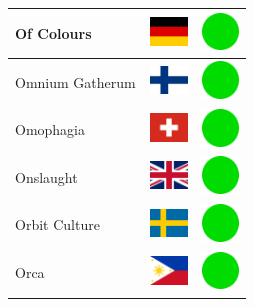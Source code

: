 \documentclass[12pt, a4paper, twoside]{report}
\begin{document}
\begin{center}
\begin{longtable}{|p{5cm}|p{2cm}|p{2cm}|}
			Of Colours & \includegraphics[width=1cm]{4x3/de} & \includegraphics[width=1cm]{likes/y} \\ \hline
			Omnium Gatherum & \includegraphics[width=1cm]{4x3/fi} & \includegraphics[width=1cm]{likes/y} \\ \hline
			Omophagia & \includegraphics[width=1cm]{4x3/ch} & \includegraphics[width=1cm]{likes/y} \\ \hline
			Onslaught & \includegraphics[width=1cm]{4x3/gb} & \includegraphics[width=1cm]{likes/y} \\ \hline
			Orbit Culture & \includegraphics[width=1cm]{4x3/se} & \includegraphics[width=1cm]{likes/y} \\ \hline
			Orca & \includegraphics[width=1cm]{4x3/ph} & \includegraphics[width=1cm]{likes/y} \\ \hline

\end{longtable}
\end{center}
\end{document}
